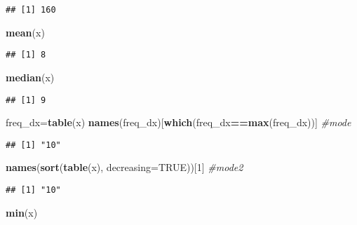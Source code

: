 \documentclass[]{article}
\newenvironment{Shaded}{\begin{snugshade}}{\end{snugshade}}
\newcommand{\CommentTok}[1]{\textcolor[rgb]{0.56,0.35,0.01}{\textit{#1}}}
\newcommand{\DataTypeTok}[1]{\textcolor[rgb]{0.13,0.29,0.53}{#1}}
\newcommand{\DecValTok}[1]{\textcolor[rgb]{0.00,0.00,0.81}{#1}}
\newcommand{\KeywordTok}[1]{\textcolor[rgb]{0.13,0.29,0.53}{\textbf{#1}}}
\newcommand{\NormalTok}[1]{#1}
\newcommand{\OperatorTok}[1]{\textcolor[rgb]{0.81,0.36,0.00}{\textbf{#1}}}
\newcommand{\OtherTok}[1]{\textcolor[rgb]{0.56,0.35,0.01}{#1}}
\begin{document}
\begin{verbatim}
## [1] 160
\end{verbatim}

\begin{Shaded}
\begin{Highlighting}[]
\KeywordTok{mean}\NormalTok{(x)}
\end{Highlighting}
\end{Shaded}

\begin{verbatim}
## [1] 8
\end{verbatim}

\begin{Shaded}
\begin{Highlighting}[]
\KeywordTok{median}\NormalTok{(x)}
\end{Highlighting}
\end{Shaded}

\begin{verbatim}
## [1] 9
\end{verbatim}

\begin{Shaded}
\begin{Highlighting}[]
\NormalTok{freq_dx=}\KeywordTok{table}\NormalTok{(x)}
\KeywordTok{names}\NormalTok{(freq_dx)[}\KeywordTok{which}\NormalTok{(freq_dx}\OperatorTok{==}\KeywordTok{max}\NormalTok{(freq_dx))] }\CommentTok{#mode}
\end{Highlighting}
\end{Shaded}

\begin{verbatim}
## [1] "10"
\end{verbatim}

\begin{Shaded}
\begin{Highlighting}[]
\KeywordTok{names}\NormalTok{(}\KeywordTok{sort}\NormalTok{(}\KeywordTok{table}\NormalTok{(x), }\DataTypeTok{decreasing=}\OtherTok{TRUE}\NormalTok{))[}\DecValTok{1}\NormalTok{] }\CommentTok{#mode2}
\end{Highlighting}
\end{Shaded}

\begin{verbatim}
## [1] "10"
\end{verbatim}

\begin{Shaded}
\begin{Highlighting}[]
\KeywordTok{min}\NormalTok{(x)}
\end{Highlighting}
\end{Shaded}
\end{document}

